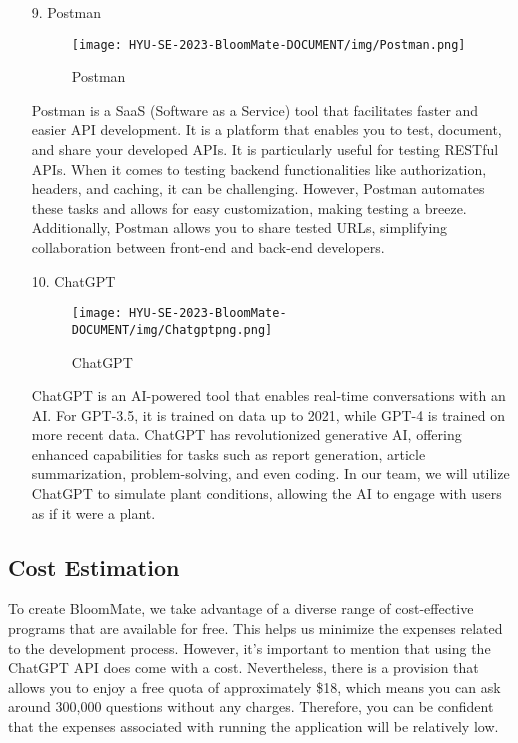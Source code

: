 \documentclass[conference, a4paper]{IEEEtran}
\begin{document}
\begin{enumerate}
    \item[9.]Postman
    \begin{figure}[h]
    \centering
    \texttt{[image: HYU-SE-2023-BloomMate-DOCUMENT/img/Postman.png]}
    \label{fig:Postman}
    \caption{Postman} 
    \end{figure}
    \item[]Postman is a SaaS (Software as a Service) tool that facilitates faster and easier API development. It is a platform that enables you to test, document, and share your developed APIs. It is particularly useful for testing RESTful APIs. When it comes to testing backend functionalities like authorization, headers, and caching, it can be challenging. However, Postman automates these tasks and allows for easy customization, making testing a breeze. Additionally, Postman allows you to share tested URLs, simplifying collaboration between front-end and back-end developers.\\



    \item[10.]ChatGPT
    \begin{figure}[h]
    \centering
    \texttt{[image: HYU-SE-2023-BloomMate-DOCUMENT/img/Chatgptpng.png]}
    \label{fig:ChatGPT}
    \caption{ChatGPT} 
    \end{figure} 
    \item[]ChatGPT is an AI-powered tool that enables real-time conversations with an AI. For GPT-3.5, it is trained on data up to 2021, while GPT-4 is trained on more recent data. ChatGPT has revolutionized generative AI, offering enhanced capabilities for tasks such as report generation, article summarization, problem-solving, and even coding. In our team, we will utilize ChatGPT to simulate plant conditions, allowing the AI to engage with users as if it were a plant.\\ 
\end{enumerate}


\subsection{Cost Estimation}
To create BloomMate, we take advantage of a diverse range of cost-effective programs that are available for free. This helps us minimize the expenses related to the development process. However, it's important to mention that using the ChatGPT API does come with a cost. Nevertheless, there is a provision that allows you to enjoy a free quota of approximately \$18, which means you can ask around 300,000 questions without any charges. Therefore, you can be confident that the expenses associated with running the application will be relatively low.\\
\end{document}
